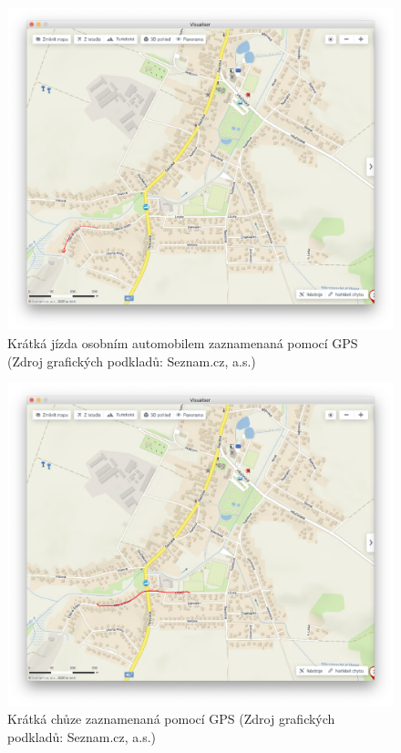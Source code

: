 \documentclass[czech, bachelor]{diploma}
\begin{document}
\begin{figure}
    \centering
    \includegraphics[width=1\textwidth]{Figures/olsinaautem.png}
    \caption{Krátká jízda osobním automobilem zaznamenaná pomocí GPS (Zdroj grafických podkladů: Seznam.cz, a.s.)}
    \label{fig:olsinaautem-fullsize}
\end{figure}

\begin{figure}
    \centering
    \includegraphics[width=1\textwidth]{Figures/olsinapesky.png}
    \caption{Krátká chůze zaznamenaná pomocí GPS (Zdroj grafických podkladů: Seznam.cz, a.s.)}
    \label{fig:olsinapesky-fullsize}
\end{figure}
\end{document}
